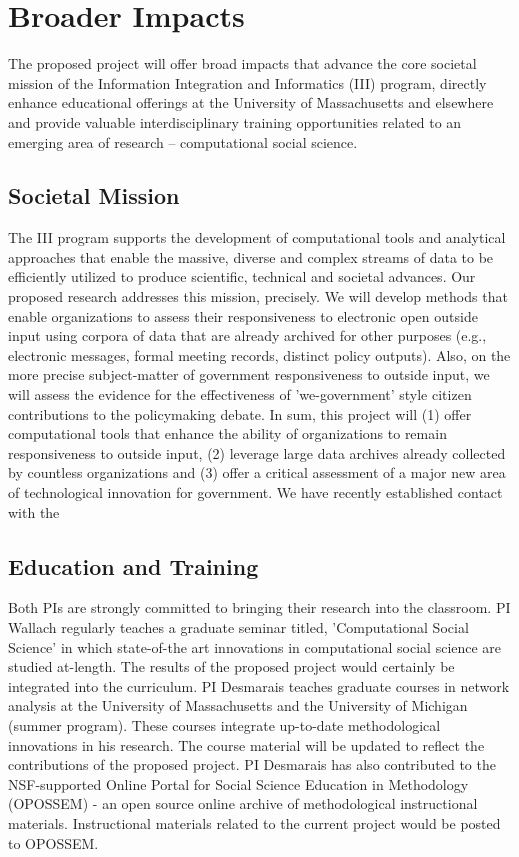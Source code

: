 \section{Broader Impacts}

The proposed project will offer broad impacts that advance the core societal mission of the Information Integration and Informatics (III) program, directly enhance educational offerings at the University of Massachusetts and elsewhere and provide valuable interdisciplinary training opportunities related to an emerging area of research -- computational social science.

\subsection{Societal Mission}

The III program supports the development of computational tools and analytical approaches that enable the massive, diverse and complex streams of data to be efficiently utilized to produce scientific, technical and societal advances. Our proposed research addresses this mission, precisely. We will develop methods that enable organizations to assess their responsiveness to electronic open outside input using corpora of data that are already archived for other purposes (e.g., electronic messages, formal meeting records, distinct policy outputs). Also, on the more precise subject-matter of government responsiveness to outside input, we will assess the evidence for the effectiveness of 'we-government' style citizen contributions to the policymaking debate. In sum, this project will (1) offer computational tools that enhance the ability of organizations to remain responsiveness to outside input, (2) leverage large data archives already collected by countless organizations and (3) offer a critical assessment of a major new area of technological innovation for government. We have recently established contact with the 

\subsection{Education and Training}

Both PIs are strongly committed to bringing their research into the classroom. PI Wallach regularly teaches a graduate seminar titled, 'Computational Social Science' in which state-of-the art innovations in computational social science are studied at-length. The results of the proposed project would certainly be integrated into the curriculum. PI Desmarais teaches graduate courses in network analysis at the University of Massachusetts and the University of Michigan (summer program). These courses integrate up-to-date methodological innovations in his research. The course material will be updated to reflect the contributions of the proposed project. PI Desmarais has also contributed to the NSF-supported Online Portal for Social Science Education in Methodology (OPOSSEM) - an open source online archive of methodological instructional materials. Instructional materials related to the current project would be posted to OPOSSEM.

